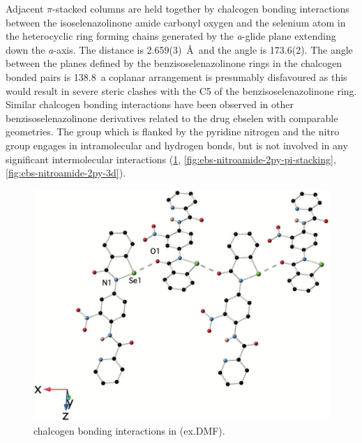 \begin{refsection}
Adjacent $\pi$-stacked columns are held together by chalcogen bonding interactions between the isoselenazolinone amide carbonyl oxygen and the selenium atom in the heterocyclic ring forming chains generated by the \emph{a}-glide plane extending down the \emph{a}-axis.
The  distance is 2.659(3)~\AA~and the  angle is 173.6(2)\degree.
The angle between the planes defined by the benzisoselenazolinone rings in the chalcogen bonded pairs is 138.8\degree~a coplanar arrangement is presumably disfavoured as this would result in severe steric clashes with the C5 of the benzisoselenazolinone ring.
Similar  chalcogen bonding interactions have been observed in other benzisoselenazolinone derivatives related to the drug ebselen with comparable geometries.\autocite{Fellowes2019,Thomas2015,Bhabak2007,Piatek1995}
The  group which is flanked by the pyridine nitrogen and the nitro group engages in intramolecular  and  hydrogen bonds, but is not involved in any significant intermolecular interactions (\cref{fig:ebs-nitroamide-2py-o-se}, \cref{fig:ebs-nitroamide-2py-pi-stacking}, \cref{fig:ebs-nitroamide-2py-3d}).

\begin{figure}
    \centering
    \includegraphics[width=0.8\linewidth]{Figures/ebs-nitroamide-2py-o-se.pdf}
    \caption{ chalcogen bonding interactions in (ex.DMF).}
    \label{fig:ebs-nitroamide-2py-o-se}
\end{figure}


\end{refsection}
